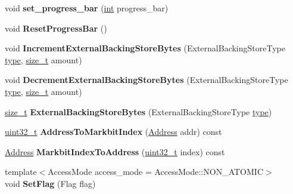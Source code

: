 \begin{DoxyCompactItemize}
void {\bfseries set\+\_\+progress\+\_\+bar} (\mbox{\hyperlink{classint}{int}} progress\+\_\+bar)
\item 
\mbox{\label{classv8_1_1internal_1_1MemoryChunk_ac13610ea6eb684978417777426efa41f}} 
void {\bfseries Reset\+Progress\+Bar} ()
\item 
\mbox{\label{classv8_1_1internal_1_1MemoryChunk_a18a9603bf6539a94a0c54edd13c00a4b}} 
void {\bfseries Increment\+External\+Backing\+Store\+Bytes} (External\+Backing\+Store\+Type \mbox{\hyperlink{classstd_1_1conditional_1_1type}{type}}, \mbox{\hyperlink{classsize__t}{size\+\_\+t}} amount)
\item 
\mbox{\label{classv8_1_1internal_1_1MemoryChunk_a9591ceaf1eaf8013f79d0bf8bc4c89dc}} 
void {\bfseries Decrement\+External\+Backing\+Store\+Bytes} (External\+Backing\+Store\+Type \mbox{\hyperlink{classstd_1_1conditional_1_1type}{type}}, \mbox{\hyperlink{classsize__t}{size\+\_\+t}} amount)
\item 
\mbox{\label{classv8_1_1internal_1_1MemoryChunk_aadee23476f55bc3f1d2c7e1d1aef6c0a}} 
\mbox{\hyperlink{classsize__t}{size\+\_\+t}} {\bfseries External\+Backing\+Store\+Bytes} (External\+Backing\+Store\+Type \mbox{\hyperlink{classstd_1_1conditional_1_1type}{type}})
\item 
\mbox{\label{classv8_1_1internal_1_1MemoryChunk_ad5a5c2cbc2fbbeff0b3c14af550a521f}} 
\mbox{\hyperlink{classuint32__t}{uint32\+\_\+t}} {\bfseries Address\+To\+Markbit\+Index} (\mbox{\hyperlink{classuintptr__t}{Address}} addr) const
\item 
\mbox{\label{classv8_1_1internal_1_1MemoryChunk_aaf484261c76342e210189a1563f1161b}} 
\mbox{\hyperlink{classuintptr__t}{Address}} {\bfseries Markbit\+Index\+To\+Address} (\mbox{\hyperlink{classuint32__t}{uint32\+\_\+t}} index) const
\item 
\mbox{\label{classv8_1_1internal_1_1MemoryChunk_ac95acc4fb17f8c25a92b2e7573cac490}} 
{\footnotesize template$<$Access\+Mode access\+\_\+mode = Access\+Mode\+::\+N\+O\+N\+\_\+\+A\+T\+O\+M\+IC$>$ }\\void {\bfseries Set\+Flag} (Flag flag)

\end{DoxyCompactItemize}
